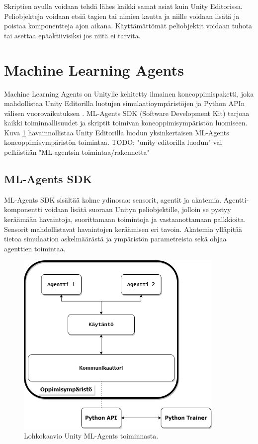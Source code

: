 \documentclass[utf8]{gradu3}
\begin{document}
Skriptien avulla voidaan tehdä lähes kaikki samat asiat kuin Unity Editorissa. Peliobjekteja voidaan etsiä tagien tai nimien kautta ja niille voidaan lisätä ja poistaa komponentteja ajon aikana. Käyttämättömät peliobjektit voidaan tuhota tai asettaa epäaktiivisiksi jos niitä ei tarvita.

\section{Machine Learning Agents}

Machine Learning Agents on Unitylle kehitetty ilmainen koneoppimispaketti, joka mahdollistaa Unity Editorilla luotujen simulaatioympäristöjen ja Python APIn välisen vuorovaikutuksen \parencite{juliani2018unity}. ML-Agents SDK (Software Development Kit) tarjoaa kaikki toiminnallisuudet ja skriptit toimivan koneoppimisympäristön luomiseen. Kuva \ref{mlagentsstructure} havainnollistaa Unity Editorilla luodun yksinkertaisen ML-Agents koneoppimisympäristön toimintaa. TODO: "unity editorilla luodun" vai pelkästään "ML-agentsin toimintaa/rakennetta"

\subsection{ML-Agents SDK}

ML-Agents SDK sisältää kolme ydinosaa: sensorit, agentit ja akatemia. Agentti-komponentti voidaan lisätä suoraan Unityn peliobjektille, jolloin se pystyy keräämään havaintoja, suorittamaan toimintoja ja vastaanottamaan palkkioita. Sensorit mahdollistavat havaintojen keräämisen eri tavoin. Akatemia ylläpitää tietoa simulaation askelmäärästä ja ympäristön parametreista sekä ohjaa agenttien toimintaa.

\begin{figure}[h]
\centering
\includegraphics[width=10cm]{mlagents_structure.png}
\caption{Lohkokaavio Unity ML-Agents toiminnasta.}
\label{mlagentsstructure}
\end{figure}
\end{document}
